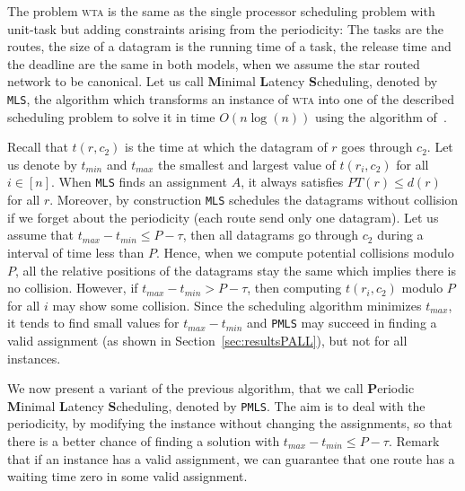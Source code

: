 \documentclass[a4paper,10pt]{journal}
\newcommand\greedydeadline{\texttt{GreedyDeadline}\xspace}
\newcommand\MLS{\texttt{MLS}\xspace}
\newcommand\PMLS{\texttt{PMLS}\xspace}
\newcommand\wta{\textsc{wta}\xspace}
\begin{document}
     
     The problem \wta is the same as the single processor scheduling problem with unit-task but adding constraints arising from
     the periodicity: The tasks are the routes, the size of a datagram is the running time of a task, 
     the release time and the deadline are the same in both models, when we assume the star routed network to be canonical.
	 Let us call \textbf{M}inimal \textbf{L}atency \textbf{S}cheduling, denoted by \MLS, the algorithm which transforms an instance of \wta into one of the described scheduling problem to solve it in time $O(n\log(n))$ using the algorithm of~\cite{garey1981scheduling}.
     
     Recall that $t(r,c_2)$ is the time at which the datagram of $r$ goes through $c_2$. Let us denote by $t_{min}$ and $t_{max}$ the smallest and largest value of $t(r_i,c_2)$ for all $i \in[n]$. When \MLS finds an assignment $A$, it always satisfies $PT(r) \leq d(r)$ for all $r$. Moreover, by construction \MLS schedules the datagrams without collision if we forget about the periodicity (each route send only one datagram). Let us assume that $t_{max}- t_{min} \leq P -\tau $, then all datagrams go through $c_2$ during a interval of time less than $P$. Hence, when we compute potential collisions modulo $P$, all the relative positions of the datagrams stay the same which implies there is no collision. However, if $t_{max}- t_{min} > P -\tau $, then computing $t(r_i,c_2)$ modulo $P$ for all $i$ may show some collision. Since the scheduling algorithm minimizes $t_{max}$, it tends to find  small values for $t_{max} - t_{min}$ and \PMLS may succeed in finding a valid assignment (as shown in Section~\ref{sec:resultsPALL}), but not for all instances. 
     
     We now present a variant of the previous algorithm, that we call
     \textbf{P}eriodic \textbf{M}inimal \textbf{L}atency \textbf{S}cheduling, denoted by \PMLS. The aim is to deal with the periodicity, by modifying the instance without changing the assignments, so that there is a better chance of finding a solution with $t_{max}- t_{min} \leq P -\tau $.  Remark that if an instance has a valid assignment, we can guarantee that one route has a waiting time zero in some valid assignment. 
     
\end{document}
